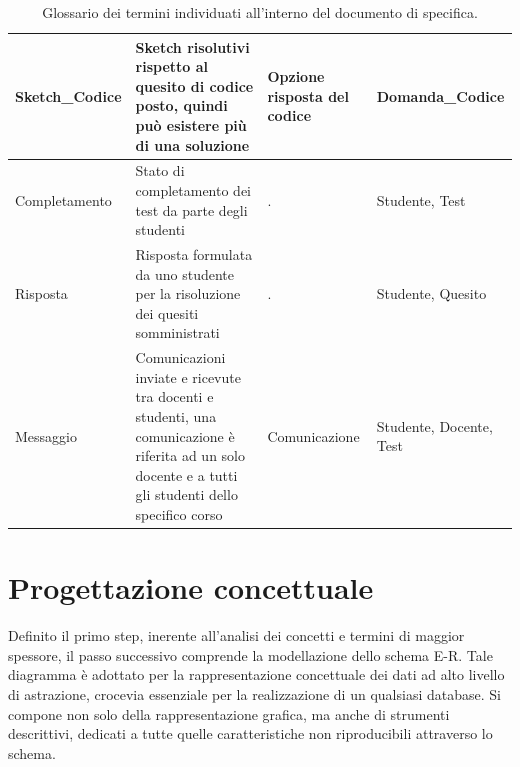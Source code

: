 \documentclass{article}
\begin{document}
\begin{table}[H]
\begin{tabularx}{\textwidth}{|X|p{6cm}|X|X|}
        \hline
        Sketch\_Codice & Sketch risolutivi rispetto al quesito di codice posto, quindi può esistere più di una soluzione & Opzione risposta del codice & Domanda\_Codice \\
        \hline
        Completamento & Stato di completamento dei test da parte degli studenti & . & Studente, Test \\
        \hline
        Risposta & Risposta formulata da uno studente per la risoluzione dei quesiti somministrati & . & Studente, Quesito \\
        \hline 
        Messaggio & Comunicazioni inviate e ricevute tra docenti e studenti, una comunicazione è riferita ad un solo docente e a tutti gli studenti dello specifico corso & Comunicazione & Studente, Docente, Test \\
        \hline
    \end{tabularx}
    \caption{Glossario dei termini individuati all'interno del documento di specifica.}
\end{table}

\newpage
\section{Progettazione concettuale}
\large
Definito il primo step, inerente all'analisi dei concetti e termini di maggior spessore, il passo successivo comprende la modellazione dello schema E-R. Tale diagramma è adottato per la rappresentazione concettuale dei dati ad alto livello di astrazione, crocevia essenziale per la realizzazione di un qualsiasi database. Si compone non solo della rappresentazione grafica, ma anche di strumenti descrittivi, dedicati a tutte quelle caratteristiche non riproducibili attraverso lo schema. 
\end{document}
